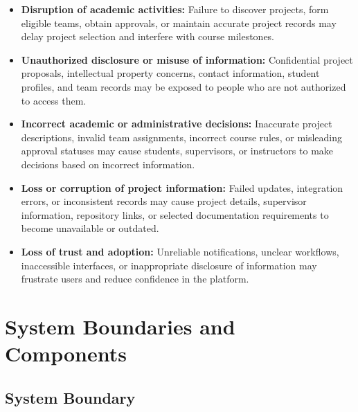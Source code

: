 \documentclass{article}
\begin{document}
\begin{itemize}
    \item \textbf{Disruption of academic activities:}
    Failure to discover projects, form eligible teams, obtain
    approvals, or maintain accurate project records may delay
    project selection and interfere with course milestones.

    \item \textbf{Unauthorized disclosure or misuse of
    information:}
    Confidential project proposals, intellectual property
    concerns, contact information, student profiles, and
    team records may be exposed to people who are not
    authorized to access them.

    \item \textbf{Incorrect academic or administrative
    decisions:}
    Inaccurate project descriptions, invalid team assignments,
    incorrect course rules, or misleading approval statuses
    may cause students, supervisors, or instructors to make
    decisions based on incorrect information.

    \item \textbf{Loss or corruption of project
    information:}
    Failed updates, integration errors, or inconsistent
    records may cause project details, supervisor
    information, repository links, or selected documentation
    requirements to become unavailable or outdated.

    \item \textbf{Loss of trust and adoption:}
    Unreliable notifications, unclear workflows, inaccessible
    interfaces, or inappropriate disclosure of information
    may frustrate users and reduce confidence in the platform.
\end{itemize}

\section{System Boundaries and Components}



\subsection{System Boundary}
\end{document}
